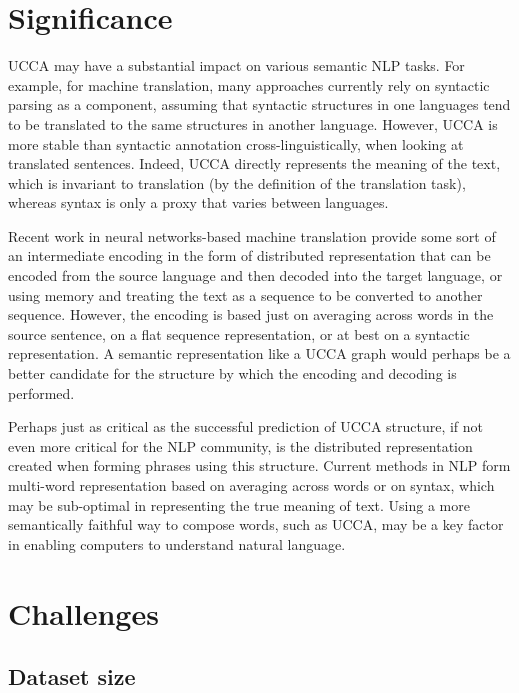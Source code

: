\documentclass[11pt]{article}
\begin{document}
\section{Significance}\label{sec:significance}

UCCA may have a substantial impact on various semantic NLP tasks. For example,
for machine translation, many approaches currently rely on syntactic parsing as
a component, assuming that syntactic structures in one languages tend to be
translated to the same structures in another language. However, UCCA is more
stable than syntactic annotation cross-linguistically, when looking at
translated sentences\cite{sulem2014thesis}. Indeed, UCCA directly represents
the meaning of the text, which is invariant to translation (by the definition
of the translation task), whereas syntax is only a proxy that varies between
languages.

Recent work in neural networks-based machine translation provide some sort of
an intermediate encoding in the form of distributed representation that can be
encoded from the source language and then decoded into the target
language\cite{zou2013bilingual}, or using memory and treating the text as a
sequence to be converted to another sequence\cite{sutskever2014sequence}.
However, the encoding is based just on averaging across words in the source
sentence, on a flat sequence representation, or at best on a syntactic
representation. A semantic representation like a UCCA graph would perhaps be a
better candidate for the structure by which the encoding and decoding is
performed.

Perhaps just as critical as the successful prediction of UCCA structure, if not
even more critical for the NLP community, is the distributed representation
created when forming phrases using this structure. Current methods in NLP form
multi-word representation based on averaging across words or on syntax, which
may be sub-optimal in representing the true meaning of text. Using a more
semantically faithful way to compose words, such as UCCA, may be a key factor
in enabling computers to understand natural language.



\section{Challenges}\label{sec:challenges}

\subsection{Dataset size}
\end{document}

